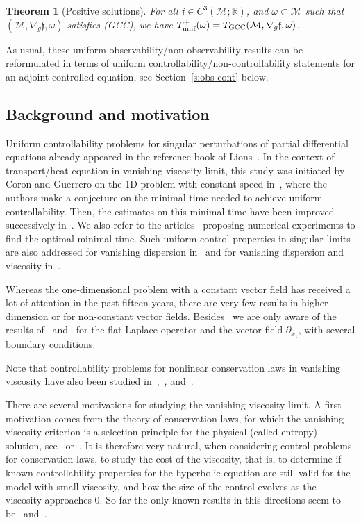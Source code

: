 \documentclass[10pt]{amsart}
\newcommand{\GCC}{\textup{GCC}}
\newcommand{\pGCC}{\textup{(GCC)}\xspace}
\newcommand{\unif}{\textup{unif}}
\newtheorem{theorem}[lemma]{Theorem}
\theoremstyle{definition}
\newcommand{\M}{\ensuremath{\mathcal M}}
\newcommand{\mb}[1]{\ensuremath{\mathbb{#1}}}
\newcommand{\R}{{\mb{R}}}
\newcommand{\f}{\ensuremath{\mathfrak{f}}}
\let\d\partial
\begin{document}
\begin{theorem}[Positive solutions]
\label{t:positive-intro}
For all $\f \in C^3(\M;\R)$, and $\omega \subset \M$ such that $(\M,\nabla_g\f,\omega)$ satisfies \pGCC, we have $T_{\unif}^+(\omega) = T_{\GCC}(\M,\nabla_g\f,\omega)$.
\end{theorem}


As usual, these uniform observability/non-observability results can be reformulated in terms of uniform controllability/non-controllability statements for an adjoint controlled equation, see Section~\ref{s:obs-cont} below.

\subsection{Background and motivation}
\label{s:motiv}
Uniform controllability problems for singular perturbations of partial differential equations already appeared in the reference book of Lions~\cite[Chap.\,3]{Lio2:88}. In the context of transport/heat equation in vanishing viscosity limit, this study was initiated by Coron and Guerrero on the 1D problem with constant speed in~\cite{CG:05}, where the authors make a conjecture on the minimal time needed to achieve uniform controllability. Then, the estimates on this minimal time have been improved successively in~\cite{Gla:10,Lissy:12,Lissy:14,Lissy:15}.
We also refer to the arti\-cles~\cite{Munch:18,YM:19,YM:19bis} proposing numerical experiments to find the optimal minimal time.
Such uniform control properties in singular limits are also addressed for vanishing dispersion in~\cite{GG:08} and for vanishing dispersion and viscosity in~\cite{GG:09}.

Whereas the one-dimensional problem with a constant vector field has received a lot of attention in the past fifteen years, there are very few results in higher dimension or for non-constant vector fields. Besides~\cite{GL:07} we are only aware of the results of~\cite{Barcena:20} and~\cite{Barcena:21} for the flat Laplace operator and the vector field $\d_{x_1}$, with several boundary conditions.

Note that controllability problems for nonlinear conservation laws in vanishing viscosity have also been studied in~\cite{GG:07},~\cite{Lea:11}, and~\cite{Marbach:14}.

There are several motivations for studying the vanishing viscosity limit.
A first motivation comes from the theory of conservation laws, for which the vanishing viscosity criterion is a selection principle for the physical (called entropy) solution, see~\cite{Kru:70} or~\cite[Chap.\,6]{Daf:00}.
It is therefore very natural, when considering control problems for conservation laws, to study the cost of the viscosity,
that is, to determine if known controllability properties for the hyperbolic equation are still valid for the model with
small viscosity, and how the size of the control evolves as the viscosity approaches $0$. So far the only known results in this directions seem to be~\cite{GG:07} and~\cite{Lea:11}.
\end{document}
